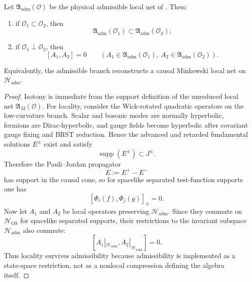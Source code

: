 \begin{theorem}
\label{thm:admissible-local-minkowski-net}
Let $\mathfrak A_{\mathrm{adm}}(\mathcal O)$ be the physical admissible local net of
. Then:
\begin{enumerate}[label=\textup{(\roman*)}, leftmargin=1.8em, topsep=3pt, itemsep=2pt]
    \item if $\mathcal O_1\subset\mathcal O_2$, then
    \[
    \mathfrak A_{\mathrm{adm}}(\mathcal O_1)\subset \mathfrak A_{\mathrm{adm}}(\mathcal O_2);
    \]
    \item if $\mathcal O_1\perp\mathcal O_2$, then
    \[
    [A_1,A_2]=0
    \qquad
    (A_1\in\mathfrak A_{\mathrm{adm}}(\mathcal O_1),\ A_2\in\mathfrak A_{\mathrm{adm}}(\mathcal O_2)).
    \]
\end{enumerate}
Equivalently, the admissible branch reconstructs a causal Minkowski local net on
$\mathcal H_{\mathrm{adm}}$.
\end{theorem}

\begin{proof}
Isotony is immediate from the support definition of the unreduced local net
$\mathfrak A_M(\mathcal O)$. For locality, consider the Wick-rotated quadratic operators on the
low-curvature branch. Scalar and bosonic modes are normally hyperbolic, fermions are
Dirac-hyperbolic, and gauge fields become hyperbolic after covariant gauge fixing and BRST
reduction. Hence the advanced and retarded fundamental solutions $E^\pm$ exist and satisfy
\[
\operatorname{supp}(E^\pm)\subset J^\pm.
\]
Therefore the Pauli--Jordan propagator
\[
E:=E^+-E^-
\]
has support in the causal cone, so for spacelike separated test-function supports one has
\[
[\Phi_i(f),\Phi_j(g)]_{\mp}=0.
\]
Now let $A_1$ and $A_2$ be local operators preserving $\mathcal H_{\mathrm{adm}}$. Since they
commute on $\mathcal H_{\mathrm{OS}}$ for spacelike separated supports, their restrictions to the
invariant subspace $\mathcal H_{\mathrm{adm}}$ also commute:
\[
[A_1|_{\mathcal H_{\mathrm{adm}}},A_2|_{\mathcal H_{\mathrm{adm}}}]=0.
\]
Thus locality survives admissibility because admissibility is implemented as a state-space
restriction, not as a nonlocal compression defining the algebra itself.
\end{proof}

